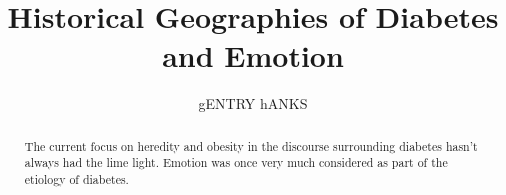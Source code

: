 \documentclass[12pt]{article}
\title{Historical Geographies of Diabetes and Emotion}
\author{gENTRY hANKS}
\begin{document}
\maketitle


\newpage
\begin{abstract}
\doublespacing 
The current focus on heredity and obesity in the discourse surrounding diabetes hasn't always had the lime light. Emotion was once very much considered as part of the etiology of diabetes. 
\end{abstract}





\newpage
\singlespacing


\end{document}
